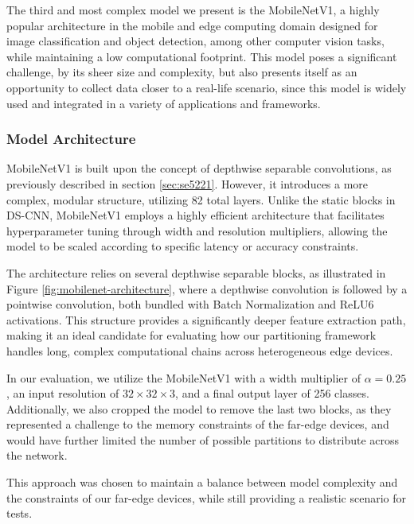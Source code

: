 The third and most complex model we present is the MobileNetV1\cite{mobilenet-howard2017},
a highly popular architecture in the mobile and edge computing domain designed for
image classification and object detection, among other computer vision tasks, while
maintaining a low computational footprint. This model poses a significant challenge, by
its sheer size and complexity, but also presents itself as an opportunity to collect 
data closer to a real-life scenario, since this model is widely used and 
integrated in a variety of applications and frameworks.

\subsubsection {Model Architecture} \label{sec:se5231}

MobileNetV1 is built upon the concept of depthwise separable convolutions, as 
previously described in section \ref{sec:se5221}. However, it introduces a more complex,
modular structure, utilizing 82 total layers.
Unlike the static blocks in \ac{DS-CNN}, MobileNetV1 employs a highly efficient 
architecture that facilitates hyperparameter tuning through width and resolution 
multipliers, allowing the model to be scaled according to specific latency or accuracy 
constraints. 

The architecture relies on several depthwise separable blocks, as 
illustrated in Figure \ref{fig:mobilenet-architecture}, where a depthwise convolution  %
is followed by a pointwise convolution, both bundled with Batch Normalization and ReLU6 
activations. This structure provides a significantly deeper feature extraction path, 
making it an ideal candidate for evaluating how our partitioning framework handles long, 
complex computational chains across heterogeneous edge devices.

In our evaluation, we utilize the MobileNetV1 with a width multiplier of $\alpha=0.25$, an
input resolution of $32 \times 32 \times 3$, and a final output layer of 256 classes.
Additionally, we also cropped the model to remove the last two blocks, as they
represented a challenge to the memory constraints of the far-edge devices, and would
have further limited the number of possible partitions to distribute across the network.

This approach was chosen to 
maintain a balance between model complexity and the constraints of our far-edge devices, 
while still providing a realistic scenario for tests.

